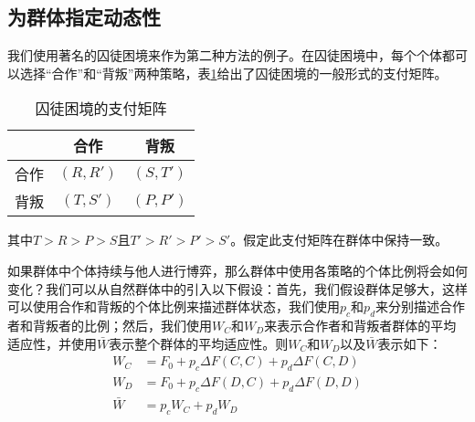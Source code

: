 \documentclass[twocolumn]{article}
\begin{document}
    \subsection{为群体指定动态性}
    \label{prisoner}
    我们使用著名的囚徒困境来作为第二种方法的例子。在囚徒困境中，每个个体都可以选择“合作”和“背叛”两种策略，表\ref{prisoners-dilemma}给出了囚徒困境的一般形式的支付矩阵。
    \begin{table}
        \centering
        \begin{tabular}{c|cc}
            \hline
            & 合作 & 背叛 \\
            \hline
            合作 & $(R, R')$ & $(S, T')$ \\
            背叛 & $(T, S')$ & $(P, P')$ \\
            \hline
        \end{tabular}
        \caption{囚徒困境的支付矩阵}
        \label{prisoners-dilemma}
    \end{table}
    其中$T>R>P>S$且$T'>R'>P'>S'$。假定此支付矩阵在群体中保持一致。

    如果群体中个体持续与他人进行博弈，那么群体中使用各策略的个体比例将会如何变化？我们可以从自然群体中的引入以下假设：首先，我们假设群体足够大，这样可以使用合作和背叛的个体比例来描述群体状态，我们使用$p_c$和$p_d$来分别描述合作者和背叛者的比例；然后，我们使用$W_C$和$W_D$来表示合作者和背叛者群体的平均适应性，并使用$\bar W$表示整个群体的平均适应性。则$W_C$和$W_D$以及$\bar W$表示如下：
    \begin{equation}
        \begin{split}
            W_C&=F_0+p_c\Delta F(C,C)+p_d\Delta F(C,D)\\
            W_D&=F_0+p_c\Delta F(D,C)+p_d\Delta F(D,D)\\
            \bar W&=p_cW_C+p_dW_D
        \end{split}
    \end{equation}
\end{document}
